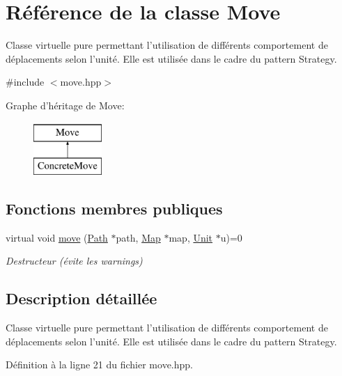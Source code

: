\hypertarget{classMove}{\section{Référence de la classe Move}
\label{classMove}
}


Classe virtuelle pure permettant l'utilisation de différents comportement de déplacements selon l'unité. Elle est utilisée dans le cadre du pattern Strategy.  




{\ttfamily \#include $<$move.\+hpp$>$}

Graphe d'héritage de Move\+:\begin{figure}[H]
\begin{center}
\leavevmode
\includegraphics[height=2.000000cm]{classMove}
\end{center}
\end{figure}
\subsection*{Fonctions membres publiques}
\begin{DoxyCompactItemize}
\item 
virtual void \hyperlink{classMove_ace4540308f0bbd21d71a18b2ff7c972d}{move} (\hyperlink{classPath}{Path} $\ast$path, \hyperlink{classMap}{Map} $\ast$map, \hyperlink{classUnit}{Unit} $\ast$u)=0
\begin{DoxyCompactList}\small\item\em Destructeur (évite les warnings) \end{DoxyCompactList}\end{DoxyCompactItemize}


\subsection{Description détaillée}
Classe virtuelle pure permettant l'utilisation de différents comportement de déplacements selon l'unité. Elle est utilisée dans le cadre du pattern Strategy. 

Définition à la ligne 21 du fichier move.\+hpp.



